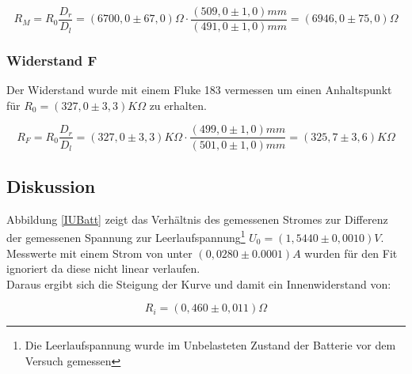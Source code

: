 \documentclass{article}
\begin{document}
$$R_M=R_0\frac{D_r}{D_l}=(6700,0 \pm 67,0) \Omega \cdot \frac{(509,0 \pm 1,0) mm}{(491,0 \pm 1,0) mm} = (6946,0 \pm 75,0) \Omega$$

\subsubsection{Widerstand F}

Der Widerstand wurde mit einem Fluke 183 vermessen um einen
Anhaltspunkt für $R_0=(327,0 \pm 3,3)K\Omega$ zu erhalten.

$$R_F=R_0\frac{D_r}{D_l}=(327,0 \pm 3,3) K\Omega \cdot \frac{(499,0 \pm 1,0) mm}{(501,0 \pm 1,0) mm} = (325,7 \pm 3,6) K\Omega$$


\subsection{Diskussion}


Abbildung \ref{IUBatt} zeigt das Verhältnis des gemessenen Stromes zur
Differenz der gemessenen Spannung zur Leerlaufspannung\footnote{Die Leerlaufspannung
wurde im Unbelasteten Zustand der Batterie vor dem Versuch gemessen}
$U_0=(1,5440 \pm 0,0010)V$. Messwerte mit einem Strom von unter $(0,0280\pm 0.0001) A$ wurden für den
Fit ignoriert da diese nicht linear verlaufen. \\

Daraus ergibt sich die Steigung der Kurve und damit ein Innenwiderstand von:

$$R_i=(0,460 \pm 0,011) \Omega$$
\end{document}
